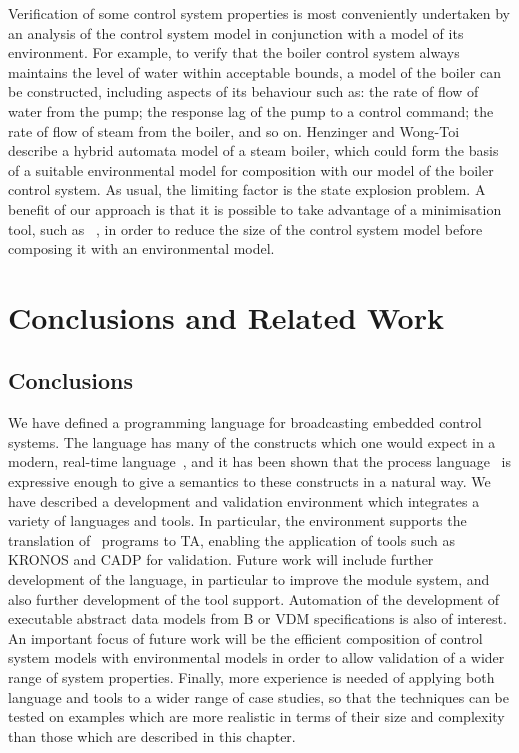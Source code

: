 Verification of some control system properties is most conveniently
undertaken by an analysis of the control system model in conjunction
with a model of its environment.  For example, to verify that the
boiler control system always maintains the level of water within
acceptable bounds, a model of the boiler can be constructed, 
including aspects of its behaviour such as: the rate of flow of water
from the pump; the response lag of the pump to a control command; the
rate of flow of steam from the boiler, and so on.  
Henzinger and Wong-Toi~\cite{hw:96} describe a
hybrid automata model of a steam boiler, which could form the basis of a 
suitable environmental model for composition with our model of the boiler
control system. As usual, the limiting factor is the state
explosion problem. A benefit of our approach is that it is possible to take
advantage of a minimisation tool, such as \minim~\cite{tri:98}, in order
to reduce the size of the control system model before composing it
with an environmental model.

\section{Conclusions and Related Work\label{sec:prconc}}
\subsection{Conclusions}
We have defined a programming language for broadcasting embedded
control systems. The language has many of the constructs which one
would expect in a modern, real-time language~\cite{bw:01}, and it has
been shown that the process language \bcandle\ is expressive enough to
give a semantics to these constructs in a natural way. We have
described a development and validation environment which integrates a
variety of languages and tools.  In particular, the environment
supports the translation of \candle\ programs to TA, enabling the
application of tools such as KRONOS and CADP for validation. Future
work will include further development of the language, in particular
to improve the module system, and also further development of the tool
support. Automation of the development of executable abstract data
models from B or VDM specifications is also of interest. An important
focus of future work will be the efficient composition of control
system models with environmental models in order to allow validation
of a wider range of system properties. Finally, more experience is
needed of applying both language and tools to a wider range of case
studies, so that the techniques can be tested on examples which are
more realistic in terms of their size and complexity than those which
are described in this chapter.

